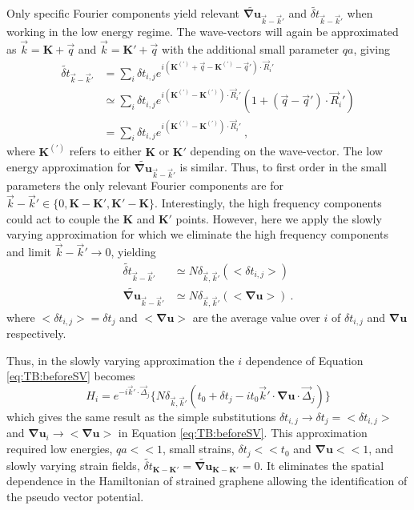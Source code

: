 Only specific Fourier components yield relevant $\widetilde{\bm{\nabla u}}_{\vec{k}-\vec{k}'}$ and $\widetilde{\delta t}_{\vec{k}-\vec{k}'}$ when working in the low energy regime.
The wave-vectors will again be approximated as $\vec{k}=\bm{K}+\vec{q}$ and $\vec{k}=\bm{K'}+\vec{q}$ with the additional small parameter $qa$, giving
\begin{align*}
  \widetilde{\delta t}_{\vec{k}-\vec{k}'} &=
    \sum_i \delta t_{i,j} e^{i(\bm{K^{(')}}+\vec{q}-\bm{K^{(')}}-\vec{q}') \cdot \vec{R}_i'} \\
                              &\simeq 
    \sum_i \delta t_{i,j} e^{i(\bm{K^{(')}}-\bm{K^{(')}}) \cdot \vec{R}_i'} (1+(\vec{q}-\vec{q}') \cdot \vec{R}_i') \\
                              &=
    \sum_i \delta t_{i,j} e^{i(\bm{K^{(')}}-\bm{K^{(')}}) \cdot \vec{R}_i'} \ ,
\end{align*}
where $\bm{K^{(')}}$ refers to either $\bm{K}$ or $\bm{K'}$ depending on the wave-vector.
The low energy approximation for $\widetilde{\bm{\nabla u}}_{\vec{k}-\vec{k}'}$ is similar.
Thus, to first order in the small parameters the only relevant Fourier components are for $\vec{k}-\vec{k}' \in \{0,\bm{K}-\bm{K'}, \bm{K'}-\bm{K} \}$.
Interestingly, the high frequency components could act to couple the $\bm{K}$ and $\bm{K}'$ points.
However, here we apply the slowly varying approximation for which we eliminate the high frequency components and limit $\vec{k}-\vec{k}' \rightarrow 0$, yielding
\begin{align*}
  \widetilde{\delta t}_{\vec{k}-\vec{k}'}     & \simeq N \delta_{\vec{k},\vec{k}'} ( <\delta t_{i,j}>) \\
  \widetilde{\bm{\nabla u}}_{\vec{k}-\vec{k}'}& \simeq N \delta_{\vec{k},\vec{k}'} ( <\bm{\nabla u} >) \ .
\end{align*}
where $<\delta t_{i,j}>=\delta t_j$ and $<\bm{\nabla u}>$ are the average value over $i$ of $\delta t_{i,j}$ and $\bm{\nabla u}$ respectively.

Thus, in the slowly varying approximation the $i$ dependence of Equation \ref{eq:TB:beforeSV} becomes
\begin{equation*}
	H_i= e^{-i \vec{k}' \cdot \vec{\Delta}_j} \bigg \{ N \delta_{\vec{k},\vec{k}'}  \left( t_0 + \delta t_j - i t_0 \vec{k}' \cdot \bm{\nabla u} \cdot \vec{\Delta}_j \right) \bigg \}
\end{equation*}
which gives the same result as the simple substitutions $\delta t_{i,j} \rightarrow \delta t_j=<\delta t_{i,j}>$ and $\bm{\nabla u}_i \rightarrow <\bm{\nabla u}>$ in Equation \ref{eq:TB:beforeSV}.
This approximation required low energies, $qa<<1$, small strains, $\delta t_j << t_0$ and $\bm{\nabla u}<<1$, and slowly varying strain fields, $\widetilde{\delta t}_{\bm{K}-\bm{K}'}=\widetilde{\bm{\nabla u}}_{\bm{K}-\bm{K}'}=0$.
It eliminates the spatial dependence in the Hamiltonian of strained graphene allowing the identification of the pseudo vector potential.